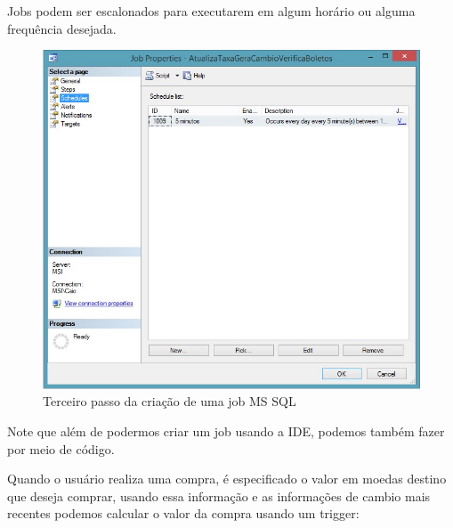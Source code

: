 \documentclass[conference]{IEEEtran}
\begin{document}
  	Jobs podem ser escalonados para executarem em algum horário ou alguma frequência desejada.

    \begin{figure}[!t]
      \centering
  	  \includegraphics[scale=0.45]{img/job3.jpg}
      \caption{Terceiro passo da criação de uma job MS SQL}
    \end{figure}

  	Note que além de podermos criar um job usando a IDE, podemos também fazer por meio de código.

  	Quando o usuário realiza uma compra, é especificado o valor em moedas destino que deseja comprar, usando essa informação e as informações de cambio mais recentes podemos calcular o valor da compra usando um trigger:
\end{document}
